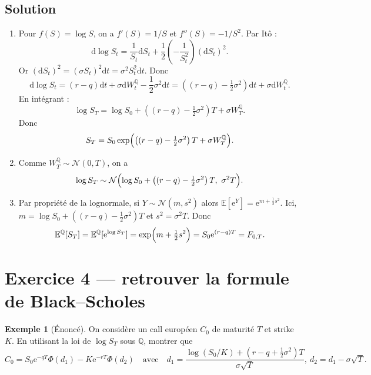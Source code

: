\documentclass[11pt,a4paper]{report}
\newcommand{\dd}{\mathrm{d}}
\newcommand{\ee}{\mathrm{e}}
\newcommand{\E}{\mathbb{E}}
\newcommand{\Q}{\mathbb{Q}}
\newcommand{\1}{\mathbbm{1}}
\newcommand{\Normal}{\mathcal{N}}
\theoremstyle{definition}
\newtheorem{example}{Exemple}[chapter]
\theoremstyle{plain}
\theoremstyle{remark}
\begin{document}
\subsection*{Solution}
\begin{enumerate}[label=\alph*)]
  \item Pour $f(S)=\log S$, on a $f'(S)=1/S$ et $f''(S)=-1/S^2$.
  Par Itô :
  \[\dd\log S_t = \frac{1}{S_t}\dd S_t + \frac12\left(-\frac{1}{S_t^2}\right)(\dd S_t)^2.
  \]
  Or $(\dd S_t)^2=(\sigma S_t)^2\dd t=\sigma^2 S_t^2\dd t$.
  Donc
  \[\dd\log S_t = (r-q)\dd t + \sigma\dd W_t^{\Q} - \frac12\sigma^2\dd t
  = \left((r-q)-\tfrac12\sigma^2\right)\dd t + \sigma\dd W_t^{\Q}.
  \]
  En intégrant :
  \[\log S_T = \log S_0 + \left((r-q)-\tfrac12\sigma^2\right)T + \sigma W_T^{\Q}.
  \]
  Donc
  \[S_T = S_0\exp\Bigl(\left((r-q)-\tfrac12\sigma^2\right)T + \sigma W_T^{\Q}\Bigr).
  \]
  \item Comme $W_T^{\Q}\sim\Normal(0,T)$, on a
  \[\log S_T\sim \Normal\Bigl(\log S_0+\left((r-q)-\tfrac12\sigma^2\right)T,\ \sigma^2 T\Bigr).
  \]
  \item Par propriété de la lognormale, si $Y\sim\Normal(m,s^2)$ alors $\E[\ee^Y]=\ee^{m+\tfrac12 s^2}$.
  Ici, $m=\log S_0+((r-q)-\tfrac12\sigma^2)T$ et $s^2=\sigma^2 T$.
  Donc
  \[\E^{\Q}[S_T]=\E^{\Q}[\ee^{\log S_T}]=\exp\Bigl(m+\tfrac12 s^2\Bigr)=S_0\ee^{(r-q)T}=F_{0,T}.
  \]
\end{enumerate}

\section{Exercice 4 --- retrouver la formule de Black--Scholes}
\begin{example}[Énoncé]
On considère un call européen $C_0$ de maturité $T$ et strike $K$.
En utilisant la loi de $\log S_T$ sous $\Q$, montrer que
\[C_0=S_0\ee^{-qT}\Phi(d_1)-K\ee^{-rT}\Phi(d_2)
\quad\text{avec}\quad
d_1=\frac{\log(S_0/K)+(r-q+\tfrac12\sigma^2)T}{\sigma\sqrt{T}},\ d_2=d_1-\sigma\sqrt{T}.
\]
\end{example}
\end{document}
